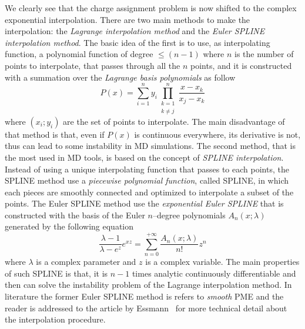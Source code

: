 We clearly see that the charge assignment problem is now shifted to the complex exponential interpolation. There are two main methods to make the interpolation: the \textit{Lagrange interpolation method} and the \textit{Euler SPLINE interpolation method}. The basic idea of the first is to use, as interpolating function, a polynomial function of degree $ \le (n-1)$ where $n$ is the number of points to interpolate, that passes through all the $n$ points, and it is constructed with a summation over the \textit{Lagrange basis polynomials} as follow
\begin{equation*}
	P(x) = \sum_{i=1}^n y_i \prod_{\substack{k=1\\k\ne j}}^n \frac{x-x_k}{x_j - x_k}
\end{equation*}
where $(x_i;y_i)$ are the set of points to interpolate. The main disadvantage of that method is that, even if $P(x)$ is continuous everywhere, its derivative is not, thus can lead to some instability in \ac{MD} simulations. The second method, that is the most used in \ac{MD} tools, is based on the concept of \textit{SPLINE interpolation}. Instead of using a unique interpolating function that passes to each points, the SPLINE method use a \textit{piecewise polynomial function}, called SPLINE, in which each pieces are smoothly connected and optimized to interpolate a subset of the points. The Euler SPLINE method use the \textit{exponential Euler SPLINE} that is constructed with the basis of the Euler $n$--degree polynomials $A_n(x;\lambda)$ generated by the following equation
\begin{equation*}
	\frac{\lambda - 1}{\lambda - e^z}e^{xz} = \sum_{n=0}^{+\infty} \frac{A_n(x;\lambda)}{n!}z^n
\end{equation*}
where $\lambda$ is a complex parameter and $z$ is a complex variable. The main properties of such SPLINE is that, it is $n-1$ times analytic continuously differentiable and then can solve the instability problem of the Lagrange interpolation method. In literature the former Euler SPLINE method is refers to \textit{smooth} \acl{PME} and the reader is addressed to the article by Essmann \etal\, \cite{EssmannSPME} for more technical detail about the interpolation procedure.

